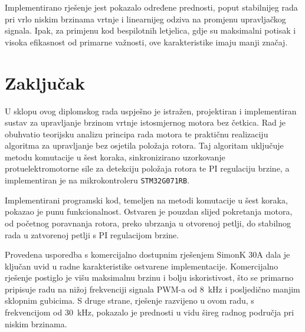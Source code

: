 \documentclass[diplomskirad]{fer}
\begin{document}
Implementirano rješenje jest pokazalo određene prednosti, poput stabilnijeg
rada pri vrlo niskim brzinama vrtnje i linearnijeg odziva na promjenu
upravljačkog signala. Ipak, za primjenu kod bespilotnih letjelica, gdje su
maksimalni potisak i visoka efikasnost od primarne važnosti, ove karakteristike
imaju manji značaj.


%


%


\chapter{Zaključak}
\label{pog:zakljucak}

U sklopu ovog diplomskog rada uspješno je istražen, projektiran i implementiran
sustav za upravljanje brzinom vrtnje istosmjernog motora bez četkica. Rad je
obuhvatio teorijsku analizu principa rada motora te praktičnu realizaciju
algoritma za upravljanje bez osjetila položaja rotora. Taj algoritam uključuje
metodu komutacije u šest koraka, sinkronizirano uzorkovanje protuelektromotorne
sile za detekciju položaja rotora te PI regulaciju brzine, a implementiran je
na mikrokontroleru \texttt{STM32G071RB}.

Implementirani programski kod, temeljen na metodi komutacije u šest koraka,
pokazao je punu funkcionalnost. Ostvaren je pouzdan slijed pokretanja motora,
od početnog poravnanja rotora, preko ubrzanja u otvorenoj petlji, do stabilnog
rada u zatvorenoj petlji s PI regulacijom brzine.

Provedena usporedba s komercijalno dostupnim rješenjem SimonK 30A dala je
ključan uvid u radne karakteristike ostvarene implementacije. Komercijalno
rješenje postiglo je višu maksimalnu brzinu i bolju iskoristivost, što se
primarno pripisuje radu na nižoj frekvenciji signala PWM-a od
\SI{8}{\kilo\hertz} i posljedično manjim sklopnim gubicima. S druge strane,
rješenje razvijeno u ovom radu, s frekvencijom od \SI{30}{\kilo\hertz},
pokazalo je prednosti u vidu šireg radnog područja pri niskim brzinama.
\end{document}
